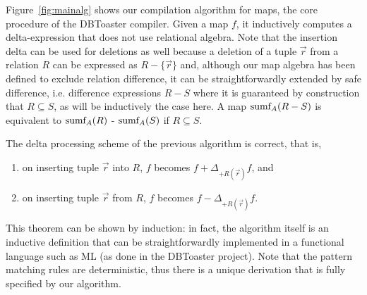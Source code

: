Figure~\ref{fig:mainalg} shows our compilation algorithm for maps, the core procedure of the DBToaster compiler.
Given a map $f$, it inductively
computes a delta-expression that does not use relational algebra.
Note that the insertion delta can be used for deletions as well because a deletion of
a tuple $\vec{r}$ from a relation $R$ can be expressed as $R - \{\vec{r}\}$ and,
although our map algebra has been defined to exclude relation difference,
it can be straightforwardly extended by safe difference, i.e. difference expressions
$R-S$ where it is guaranteed by construction that $R \subseteq S$, as will be inductively the case here. A map $\mbox{sumf}_A(R - S)$ is equivalent to
$\mbox{sumf}_A(R)$ - $\mbox{sumf}_A(S)$ if $R \subseteq S$.



\begin{theorem}
The delta processing scheme of the previous algorithm is correct,
that is,
\begin{enumerate}
\item
on inserting tuple $\vec{r}$ into $R$, $f$ becomes
$f + \Delta_{+R(\vec{r})} f$, and

\item
on inserting tuple $\vec{r}$ from $R$, $f$ becomes
$f - \Delta_{+R(\vec{r})} f$.
\end{enumerate}
\end{theorem}


This theorem can be shown by induction: in fact, the algorithm itself is an inductive
definition that can be straightforwardly implemented in a functional language such as
ML (as done in the DBToaster project). Note that the pattern matching rules are
deterministic, thus there is a unique derivation that is fully specified by our
algorithm.



